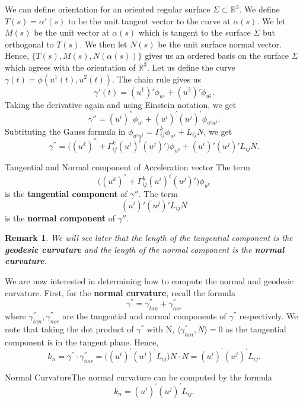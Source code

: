 \documentclass[twoside]{article}
\newtheorem{remark}[theorem]{Remark}
\begin{document}
We can define orientation for an oriented regular surface $\Sigma \subset \mathbb{R}^3$.  We define $T(s) = \alpha'(s)$ to be the unit tangent vector to the curve at $\alpha(s).$ We let $M(s)$ be the unit vector at $\alpha(s)$ which is tangent to the surface $\Sigma$ but orthogonal to $T(s).$ We then let $N(s)$ be the unit surface normal vector. Hence, $\{T(s), M(s), N(\alpha(s))\}$ gives us an ordered basis on the surface $\Sigma$ which agrees with the orientation of $\mathbb{R}^3.$
\newline
Let us define the curve $\gamma(t) = \phi(u^1(t),u^2(t)).$ The chain rule gives us 
$$
\gamma'(t) = (u^1)'\phi_{u^{1}} + (u^2)'\phi_{u^{2}}.
$$
Taking the derivative again and using Einstein notation, we get 
$$
\gamma'' = (u^i)^{''}\phi_{u^i} + (u^i)^{'}(u^j)^'\phi_{u^iu^j}.
$$
Subtituting the Gauss formula in $\phi_{u^iu^j} = \Gamma_{ij}^k\phi_{u^k} + L_{ij}N$, we get 
$$
\gamma^{''} = \bigg( (u^k)^{''} + \Gamma_{ij}^{k}(u^i)^i(u^j)' \bigg)\phi_{u^k} + (u^i)'(u^j)'L_{ij}N.
$$

\begin{definition_exam}{Tangential and Normal component of Acceleration vector}{} The term 
$$
\bigg( (u^k)^{''} + \Gamma_{ij}^{k}(u^i)^i(u^j)' \bigg)\phi_{u^k}
$$
is the \textbf{tangential component} of $\gamma''.$ The term 
$$
(u^i)'(u^j)'L_{ij}N
$$
is the \textbf{normal component} of $\gamma''.$
\end{definition_exam}

\begin{remark}We will see later that the length of the tangential component is the \textbf{geodesic curvature} and the length of the normal component is the \textbf{normal curvature}.
\end{remark}

We are now interested in determining how to compute the normal and geodesic curvature. First, for the \textbf{normal curvature}, recall the formula 
$$
\gamma^{''} = \gamma_{tan}^{''} + \gamma_{nor}^{''}
$$
where $\gamma_{tan}^{''}, \gamma_{nor}^{''}$ are the tangential and normal components of $\gamma^{''}$ respectively. We note that taking the dot product of $\gamma^{''}$ with N, $\langle \gamma_{tan}^{''},N\rangle = 0$ as the tangential component is in the tangent plane. Hence, 
$$
k_n = \gamma^{''}\cdot \gamma_{nor}^{''} = \big((u^i)^'(u^j)^'L_{ij} \big)N \cdot N = (u^i)^'(u^j)^'L_{ij}.
$$

\begin{definition_exam}{Normal Curvature}{}The normal curvature can be computed by the formula 
$$
k_n = (u^i)^'(u^j)^'L_{ij}.
$$
\end{definition_exam}
\end{document}
